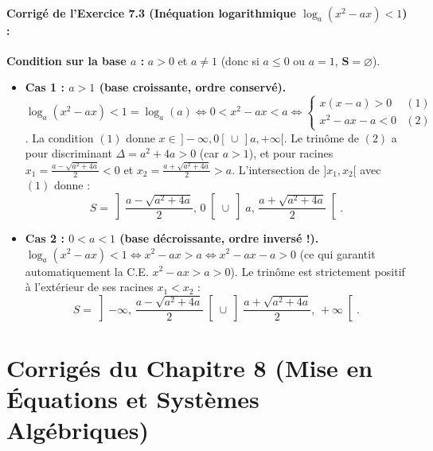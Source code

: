 \paragraph{Corrigé de l'Exercice 7.3 (Inéquation logarithmique $\log_a(x^2 - ax) < 1$) :}
\textbf{Condition sur la base $a$ :} $a > 0$ et $a \neq 1$ (donc si $a \le 0$ ou $a = 1$, $\mathbf{S = \varnothing}$).
\begin{itemize}
    \item \textbf{Cas 1 : $a > 1$ (base croissante, ordre conservé).}
    $\log_a(x^2 - ax) < 1 = \log_a(a) \iff 0 < x^2 - ax < a \iff \begin{cases} x(x - a) > 0 & (1) \\ x^2 - ax - a < 0 & (2) \end{cases}$.
    La condition $(1)$ donne $x \in \,]-\infty, 0[ \,\cup\, ]a, +\infty[$.
    Le trinôme de $(2)$ a pour discriminant $\Delta = a^2 + 4a > 0$ (car $a > 1$), et pour racines $x_1 = \frac{a - \sqrt{a^2+4a}}{2} < 0$ et $x_2 = \frac{a + \sqrt{a^2+4a}}{2} > a$. L'intersection de $]x_1, x_2[$ avec $(1)$ donne :
    \[
        S = \left]\frac{a - \sqrt{a^2 + 4a}}{2},\, 0\right[ \cup \left]a,\, \frac{a + \sqrt{a^2 + 4a}}{2}\right[.
    \]
    \item \textbf{Cas 2 : $0 < a < 1$ (base décroissante, ordre inversé !).}
    $\log_a(x^2 - ax) < 1 \iff x^2 - ax > a \iff x^2 - ax - a > 0$ (ce qui garantit automatiquement la C.E. $x^2 - ax > a > 0$). Le trinôme est strictement positif à l'extérieur de ses racines $x_1 < x_2$ :
    \[
        S = \left]-\infty,\, \frac{a - \sqrt{a^2 + 4a}}{2}\right[ \cup \left]\frac{a + \sqrt{a^2 + 4a}}{2},\, +\infty\right[.
    \]
\end{itemize}

\section{Corrigés du Chapitre 8 (Mise en Équations et Systèmes Algébriques)}

